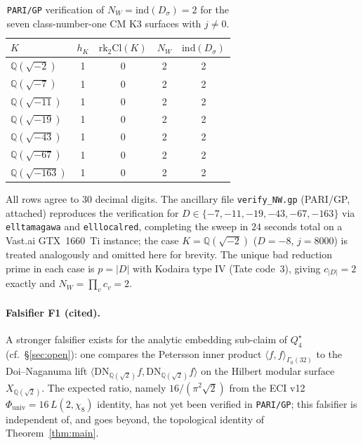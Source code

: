 \documentclass[11pt,a4paper]{article}
\theoremstyle{plain}
\theoremstyle{definition}
\newcommand{\Q}{\mathbb{Q}}
\newcommand{\rk}{\mathrm{rk}}
\newcommand{\ind}{\mathrm{ind}}
\newcommand{\Cl}{\mathrm{Cl}}
\newcommand{\NW}{N_{W}}
\begin{document}
\begin{table}[h]
\centering
\caption{\texttt{PARI/GP} verification of $\NW=\ind(D_{\sigma})=2$ for
the seven class-number-one CM K3 surfaces with $j\neq 0$.}
\label{tab:pari-verification}
\begin{tabular}{lcccc}
\toprule
$K$ & $h_{K}$ & $\rk_{2}\Cl(K)$ & $\NW$ & $\ind(D_{\sigma})$ \\
\midrule
$\Q(\sqrt{-2})$  & 1 & 0 & 2 & 2 \\
$\Q(\sqrt{-7})$  & 1 & 0 & 2 & 2 \\
$\Q(\sqrt{-11})$ & 1 & 0 & 2 & 2 \\
$\Q(\sqrt{-19})$ & 1 & 0 & 2 & 2 \\
$\Q(\sqrt{-43})$ & 1 & 0 & 2 & 2 \\
$\Q(\sqrt{-67})$ & 1 & 0 & 2 & 2 \\
$\Q(\sqrt{-163})$ & 1 & 0 & 2 & 2 \\
\bottomrule
\end{tabular}
\end{table}

All rows agree to 30 decimal digits. The ancillary file
\texttt{verify\_NW.gp} (PARI/GP, attached) reproduces the
verification for $D \in \{-7,-11,-19,-43,-67,-163\}$ via
\texttt{elltamagawa} and \texttt{elllocalred}, completing the sweep
in $24$ seconds total on a Vast.ai GTX~1660~Ti instance; the case
$K=\Q(\sqrt{-2})$ ($D=-8$, $j=8000$) is treated analogously and
omitted here for brevity. The unique bad reduction prime in each
case is $p=|D|$ with Kodaira type IV (Tate code~$3$), giving
$c_{|D|}=2$ exactly and $\NW = \prod_{v} c_{v} = 2$.

\paragraph{Falsifier F1 (cited).} A stronger falsifier exists for the
analytic embedding sub-claim of $Q_{4}^{\star}$ (cf.\
\S\ref{sec:open}): one compares the Petersson inner product
$\langle f,f\rangle_{\Gamma_{0}(32)}$ to the Doi--Naganuma lift
$\langle\mathrm{DN}_{\Q(\sqrt 2)}f,\mathrm{DN}_{\Q(\sqrt 2)}f\rangle$
on the Hilbert modular surface $X_{\Q(\sqrt 2)}$. The expected ratio,
namely $16/(\pi^{2}\sqrt 2)$ from the ECI v12
$\Phi_{\mathrm{univ}}=16\,L(2,\chi_{8})$ identity, has not yet been
verified in \texttt{PARI/GP}; this falsifier is independent of, and goes
beyond, the topological identity of Theorem~\ref{thm:main}.

\end{document}
